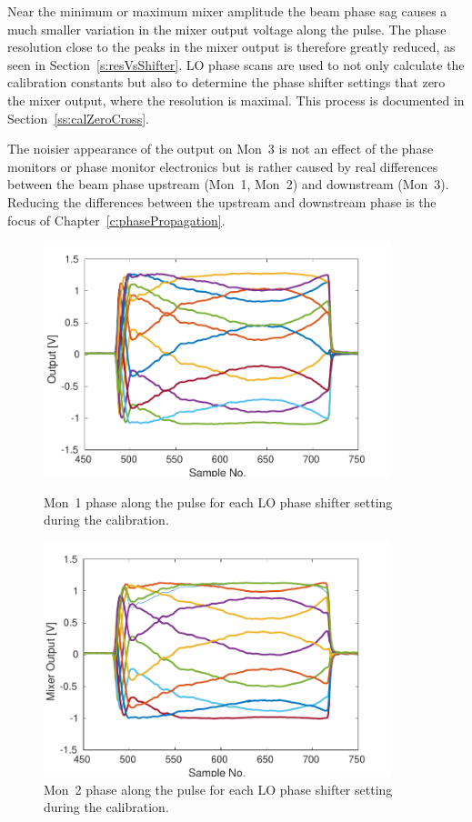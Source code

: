 Near the minimum or maximum mixer amplitude the beam phase sag causes a much smaller variation in the mixer output voltage along the pulse. The phase resolution close to the peaks in the mixer output is therefore greatly reduced, as seen in Section~\ref{s:resVsShifter}. LO phase scans are used to not only calculate the calibration constants but also to determine the phase shifter settings that zero the mixer output, where the resolution is maximal. This process is documented in Section~\ref{ss:calZeroCross}.

The noisier appearance of the output on Mon~3 is not an effect of the phase monitors or phase monitor electronics but is rather caused by real differences between the beam phase upstream (Mon~1, Mon~2) and downstream (Mon~3). Reducing the differences between the upstream and downstream phase is the focus of Chapter~\ref{c:phasePropagation}.

\begin{figure}
  \centering
  \includegraphics[width=0.9\textwidth]{Figures/phaseMons/mon1AllPoints}
  \caption{Mon~1 phase along the pulse for each LO phase shifter setting during the calibration.}
  \label{f:mon1AllPoints}
 \includegraphics[width=0.9\textwidth]{Figures/phaseMons/mon2AllPoints}
  \caption{Mon~2 phase along the pulse for each LO phase shifter setting during the calibration.}
  \label{f:mon2AllPoints}
\end{figure}

